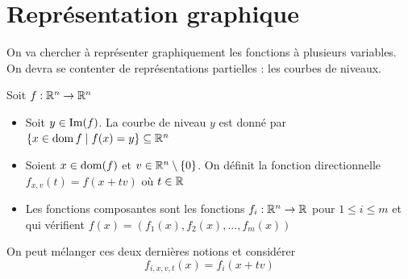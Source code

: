 \section{Représentation graphique}
On va chercher à représenter graphiquement les fonctions à plusieurs variables. On devra se contenter de représentations partielles : les courbes de niveaux.
\begin{definition}
    Soit $f:\mathbb{R}^n\to \mathbb{R} ^n$
    \begin{itemize}
        \item Soit $y\in \operatorname{Im}(f)$. La courbe de niveau $y$ est donné par $\{x\in \operatorname{dom} f\mid f(x)=y\}\subseteq \mathbb{R}^n$
        \item Soient $x\in \operatorname{dom} (f)$ et $v\in \mathbb{R} ^n\setminus\{0\}$. On définit la fonction directionnelle $f_{x,v}(t)=f(x+tv)$ où $t\in \mathbb{R}$
        \item Les fonctions composantes sont les fonctions $f_i:\mathbb{R}^n\to \mathbb{R}$ pour $1\leq i\leq m$ et qui vérifient $f(x)=(f_1(x),f_2(x),...,f_m(x))$
    \end{itemize}
\end{definition}
\begin{remarque}
    On peut mélanger ces deux dernières notions et considérer $$f_{i,x,v,t}(x)= f_i(x+tv)$$
\end{remarque}
